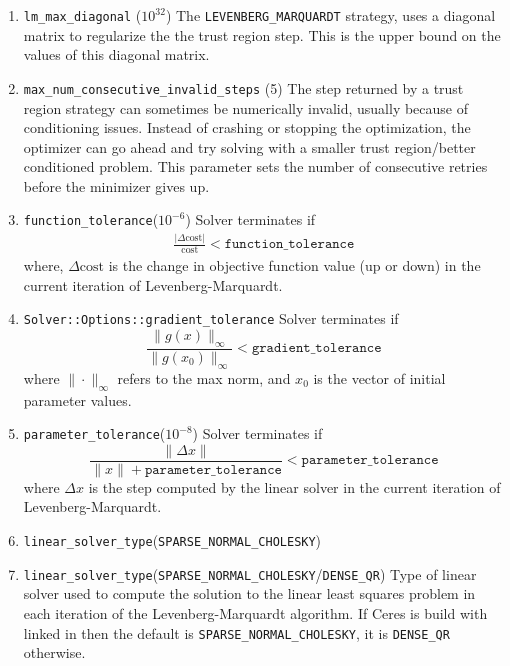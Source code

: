 \begin{enumerate}
\item{\texttt{lm\_max\_diagonal} ($10^{32}$)}  The \texttt{LEVENBERG\_MARQUARDT} strategy, uses a diagonal matrix to regularize the the trust region step. This is the upper bound on the values of this diagonal matrix.

\item{\texttt{max\_num\_consecutive\_invalid\_steps} (5)} The step returned by a trust region strategy can sometimes be numerically invalid, usually because of conditioning issues. Instead of crashing or stopping the optimization, the optimizer can go ahead and try solving with a smaller trust region/better conditioned problem. This parameter sets the number of consecutive retries before the minimizer gives up.

\item{\texttt{function\_tolerance}}($10^{-6}$) Solver terminates if
\begin{align}
\frac{|\Delta \text{cost}|}{\text{cost}} < \texttt{function\_tolerance}
\end{align}
where, $\Delta \text{cost}$ is the change in objective function value (up or down) in the current iteration of Levenberg-Marquardt.

\item \texttt{Solver::Options::gradient\_tolerance} Solver terminates if 
\begin{equation}
    \frac{\|g(x)\|_\infty}{\|g(x_0)\|_\infty} < \texttt{gradient\_tolerance}
\end{equation}
where $\|\cdot\|_\infty$ refers to the max norm, and $x_0$ is the vector of initial parameter values.

\item{\texttt{parameter\_tolerance}}($10^{-8}$) Solver terminates if 
\begin{equation}
	\frac{\|\Delta x\|}{\|x\| + \texttt{parameter\_tolerance}} < \texttt{parameter\_tolerance}
\end{equation}
where $\Delta x$ is the step computed by the linear solver in the current iteration of Levenberg-Marquardt.

\item{\texttt{linear\_solver\_type}(\texttt{SPARSE\_NORMAL\_CHOLESKY})}

\item{\texttt{linear\_solver\_type}}(\texttt{SPARSE\_NORMAL\_CHOLESKY}/\texttt{DENSE\_QR}) Type of linear solver used to compute the solution to the linear least squares problem in each iteration of the Levenberg-Marquardt algorithm. If Ceres is build with \suitesparse linked in  then the default is \texttt{SPARSE\_NORMAL\_CHOLESKY}, it is \texttt{DENSE\_QR} otherwise.


\end{enumerate}
